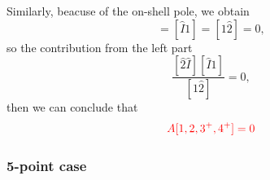 \documentclass[12pt]{article}
\numberwithin{equation}{section}
\begin{document}
    Similarly, beacuse of the on-shell pole, we obtain
    \begin{equation}
        [\hat{2}\hat{I}]=[\hat{I}1]=[1\hat{2}]=0,
    \end{equation}
    so the contribution from the left part
    \begin{equation}
        \frac{[\hat{2}\hat{I}][\hat{I}1]}{[1\hat{2}]}=0,
    \end{equation}
    then we can conclude that
    \begin{equation}
        \textcolor{red}{A[1,2,3^+,4^+]=0}
    \end{equation}

\subsubsection{5-point case}
\end{document}
